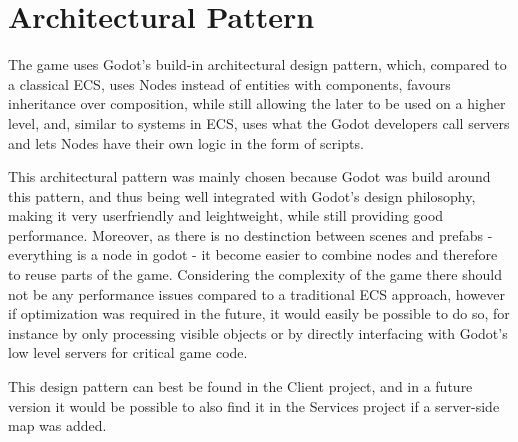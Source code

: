 \documentclass{article}
\begin{document}
\section{Architectural Pattern}
The game uses Godot's build-in architectural design pattern, which, compared to a classical ECS, uses Nodes instead of entities with components, favours inheritance over composition, while still allowing the later to be used on a higher level, and, similar to systems in ECS, uses what the Godot developers call servers and lets Nodes have their own logic in the form of scripts. 

This architectural pattern was mainly chosen because Godot was build around this pattern, and thus being well integrated with Godot's design philosophy, making it very userfriendly and leightweight, while still providing good performance. Moreover, as there is no destinction between scenes and prefabs - everything is a node in godot - it become easier to combine nodes and therefore to  reuse parts of the game. Considering the complexity of the game there should not be any performance issues compared to a traditional ECS approach, however if optimization was required in the future, it would easily be possible to do so, for instance  by only processing visible objects or by directly interfacing with Godot's low level servers for critical game code. 

This design pattern can best be found in the Client project, and in a future version it would be possible to also find it in the Services project if a server-side map was added.
\end{document}
